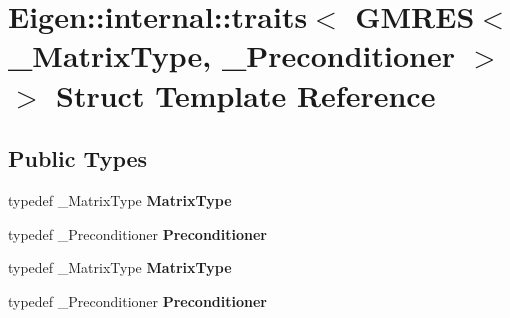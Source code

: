 \hypertarget{struct_eigen_1_1internal_1_1traits_3_01_g_m_r_e_s_3_01___matrix_type_00_01___preconditioner_01_4_01_4}{}\section{Eigen\+:\+:internal\+:\+:traits$<$ G\+M\+R\+ES$<$ \+\_\+\+Matrix\+Type, \+\_\+\+Preconditioner $>$ $>$ Struct Template Reference}
\label{struct_eigen_1_1internal_1_1traits_3_01_g_m_r_e_s_3_01___matrix_type_00_01___preconditioner_01_4_01_4}
\subsection*{Public Types}
\begin{DoxyCompactItemize}
\item 
\mbox{\label{struct_eigen_1_1internal_1_1traits_3_01_g_m_r_e_s_3_01___matrix_type_00_01___preconditioner_01_4_01_4_a50265380a4eeb8003bdd09b5d33fa8d4}} 
typedef \+\_\+\+Matrix\+Type {\bfseries Matrix\+Type}
\item 
\mbox{\label{struct_eigen_1_1internal_1_1traits_3_01_g_m_r_e_s_3_01___matrix_type_00_01___preconditioner_01_4_01_4_a468b93b021750dd91d44b6fb293ebc1c}} 
typedef \+\_\+\+Preconditioner {\bfseries Preconditioner}
\item 
\mbox{\label{struct_eigen_1_1internal_1_1traits_3_01_g_m_r_e_s_3_01___matrix_type_00_01___preconditioner_01_4_01_4_a50265380a4eeb8003bdd09b5d33fa8d4}} 
typedef \+\_\+\+Matrix\+Type {\bfseries Matrix\+Type}
\item 
\mbox{\label{struct_eigen_1_1internal_1_1traits_3_01_g_m_r_e_s_3_01___matrix_type_00_01___preconditioner_01_4_01_4_a468b93b021750dd91d44b6fb293ebc1c}} 
typedef \+\_\+\+Preconditioner {\bfseries Preconditioner}
\end{DoxyCompactItemize}


